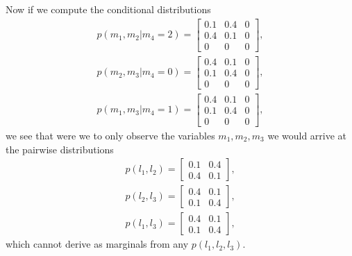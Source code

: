 Now if we compute the conditional distributions
\begin{align*}
p(m_1,m_2|m_4=2) = \begin{bmatrix}
0.1 & 0.4 & 0\\
0.4 & 0.1 & 0\\
0 & 0 & 0
\end{bmatrix},\\
p(m_2,m_3|m_4=0) = \begin{bmatrix}
0.4 & 0.1 & 0\\
0.1 & 0.4 & 0\\
0 & 0 & 0
\end{bmatrix},\\
p(m_1,m_3|m_4=1) = \begin{bmatrix}
0.4 & 0.1 & 0\\
0.1 & 0.4 & 0\\
0 & 0 & 0
\end{bmatrix},
\end{align*}
we see that were we to only observe the variables $m_1,m_2,m_3$ we would arrive at the pairwise distributions
\begin{align*}
p(l_1,l_2) = \begin{bmatrix}
0.1 & 0.4\\
0.4 & 0.1
\end{bmatrix},\\
p(l_2,l_3) = \begin{bmatrix}
0.4 & 0.1\\
0.1 & 0.4
\end{bmatrix},\\
p(l_1,l_3) = \begin{bmatrix}
0.4 & 0.1\\
0.1 & 0.4
\end{bmatrix},
\end{align*}
which cannot derive as marginals from any $p(l_1,l_2,l_3)$.





\FloatBarrier


